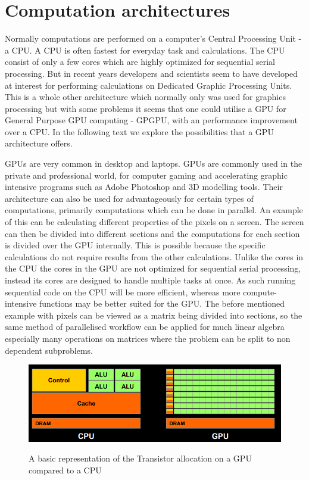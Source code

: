 \section{Computation architectures}
\label{sec:comparch}
Normally computations are performed on a computer's Central Processing Unit - a CPU.
A CPU is often fastest for everyday task and calculations.
The CPU consist of only a few cores which are highly optimized for sequential serial processing.\citep{whatisgpu}
But in recent years developers and scientists seem to have developed at interest for performing calculations on Dedicated Graphic Processing Units.\citep{gpurise}
This is a whole other architecture which normally only was used for graphics processing but with some problems it seems that one could utilise a GPU for General Purpose GPU computing - GPGPU, with an performance improvement over a CPU.
In the following text we explore the possibilities that a GPU architecture offers.

GPUs are very common in desktop and laptops. \citep{STEAMHW}
GPUs are commonly used in the private and professional world, for computer gaming and accelerating graphic intensive programs such as Adobe Photoshop and 3D modelling tools. \citep{NVIDIAADOBE}
Their architecture can also be used for advantageously for certain types of computations, primarily computations which can be done in parallel. 
An example of this can be calculating different properties of the pixels on a screen. 
The screen can then be divided into different sections and the computations for each section is divided over the GPU internally.
This is possible because the specific calculations do not require results from the other calculations.
Unlike the cores in the CPU the cores in the GPU are not optimized for sequential serial processing, instead its cores are designed to handle multiple tasks at once. 
As such running sequential code on the CPU will be more efficient, whereas more compute-intensive functions may be better suited for the GPU.\citep{NvidiaGPGPU}
The before mentioned example with pixels can be viewed as a matrix being divided into sections, so the same method of parallelised workflow can be applied for much linear algebra especially many operations on matrices where the problem can be split to non dependent subproblems.

\begin{figure}[h!]
\centering
 \includegraphics[width=1\textwidth]{figures/GPUCPUimage.png} %
\caption{A basic representation of the Transistor allocation on a GPU compared to a CPU}\label{image:GPUCPUimage}\citep{NvidiaCUDASeminar}
\vspace{-15pt}
\end{figure}

